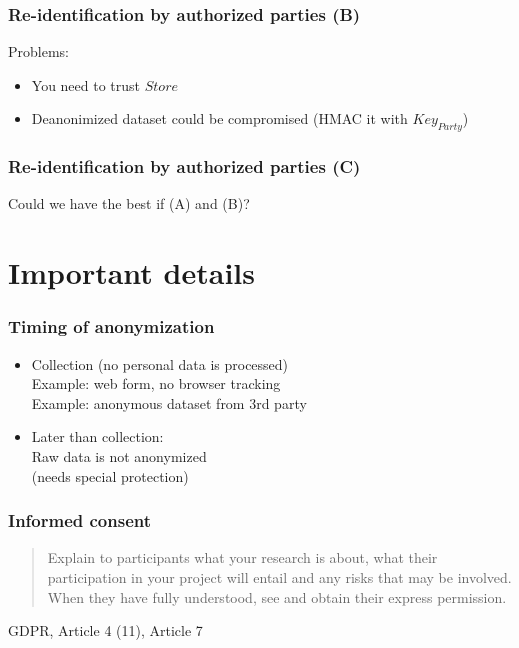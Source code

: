 \documentclass[17pt,aspectratio=169,hyperref={pdfusetitle,colorlinks,allcolors=olive}]{beamer}
\begin{document}
\begin{frame}[fragile]
  \frametitle{Re-identification by authorized parties (B)}

  Problems:

  \begin{itemize}
    \item You need to trust $Store$
    \item Deanonimized dataset could be compromised (HMAC it with $Key_{Party}$)
  \end{itemize}
\end{frame}

\begin{frame}[fragile]
  \frametitle{Re-identification by authorized parties (C)}


  \begin{center}
    Could we have the best if (A) and (B)?
  \end{center}
\end{frame}


\section{Important details}

\begin{frame}[fragile]
  \frametitle{Timing of anonymization}

  \begin{itemize}
  \item Collection (no personal data is processed) \\
    Example: web form, no browser tracking \\
    Example: anonymous dataset from 3rd party \\
  \item Later than collection: \\
    Raw data is not anonymized \\
    (needs special protection) \\
  \end{itemize}
  
\end{frame}

\begin{frame}[fragile]
  \frametitle{Informed consent}

  \begin{quote}
  Explain to participants what your research is about, what their participation in your project will entail and any risks that may be involved. When they have fully understood, see and obtain their express permission.
  \end{quote}

  \begin{flushright}
  GDPR, Article 4 (11), Article 7
  \end{flushright}
\end{frame}
\end{document}
